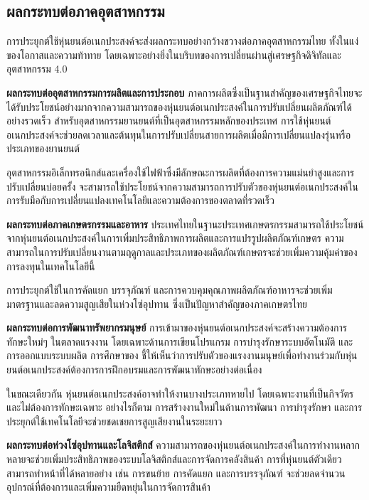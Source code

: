 \documentclass[a4paper]{article}
\begin{document}
\subsection{ผลกระทบต่อภาคอุตสาหกรรม}

การประยุกต์ใช้หุ่นยนต์อเนกประสงค์จะส่งผลกระทบอย่างกว้างขวางต่อภาคอุตสาหกรรมไทย ทั้งในแง่ของโอกาสและความท้าทาย โดยเฉพาะอย่างยิ่งในบริบทของการเปลี่ยนผ่านสู่เศรษฐกิจดิจิทัลและอุตสาหกรรม 4.0

\textbf{ผลกระทบต่ออุตสาหกรรมการผลิตและการประกอบ} ภาคการผลิตซึ่งเป็นฐานสำคัญของเศรษฐกิจไทยจะได้รับประโยชน์อย่างมากจากความสามารถของหุ่นยนต์อเนกประสงค์ในการปรับเปลี่ยนผลิตภัณฑ์ได้อย่างรวดเร็ว \parencite{mohammadi2023mobile} สำหรับอุตสาหกรรมยานยนต์ที่เป็นอุตสาหกรรมหลักของประเทศ การใช้หุ่นยนต์อเนกประสงค์จะช่วยลดเวลาและต้นทุนในการปรับเปลี่ยนสายการผลิตเมื่อมีการเปลี่ยนแปลงรุ่นหรือประเภทของยานยนต์

อุตสาหกรรมอิเล็กทรอนิกส์และเครื่องใช้ไฟฟ้าซึ่งมีลักษณะการผลิตที่ต้องการความแม่นยำสูงและการปรับเปลี่ยนบ่อยครั้ง จะสามารถใช้ประโยชน์จากความสามารถการปรับตัวของหุ่นยนต์อเนกประสงค์ในการรับมือกับการเปลี่ยนแปลงเทคโนโลยีและความต้องการของตลาดที่รวดเร็ว

\textbf{ผลกระทบต่อภาคเกษตรกรรมและอาหาร} ประเทศไทยในฐานะประเทศเกษตรกรรมสามารถใช้ประโยชน์จากหุ่นยนต์อเนกประสงค์ในการเพิ่มประสิทธิภาพการผลิตและการแปรรูปผลิตภัณฑ์เกษตร ความสามารถในการปรับเปลี่ยนงานตามฤดูกาลและประเภทของผลิตภัณฑ์เกษตรจะช่วยเพิ่มความคุ้มค่าของการลงทุนในเทคโนโลยีนี้

การประยุกต์ใช้ในการคัดแยก บรรจุภัณฑ์ และการควบคุมคุณภาพผลิตภัณฑ์อาหารจะช่วยเพิ่มมาตรฐานและลดความสูญเสียในห่วงโซ่อุปทาน ซึ่งเป็นปัญหาสำคัญของภาคเกษตรไทย

\textbf{ผลกระทบต่อการพัฒนาทรัพยากรมนุษย์} การเข้ามาของหุ่นยนต์อเนกประสงค์จะสร้างความต้องการทักษะใหม่ๆ ในตลาดแรงงาน โดยเฉพาะด้านการเขียนโปรแกรม การบำรุงรักษาระบบอัตโนมัติ และการออกแบบระบบผลิต การศึกษาของ \textcite{krishnan2023deep} ชี้ให้เห็นว่าการปรับตัวของแรงงานมนุษย์เพื่อทำงานร่วมกับหุ่นยนต์อเนกประสงค์ต้องการการฝึกอบรมและการพัฒนาทักษะอย่างต่อเนื่อง

ในขณะเดียวกัน หุ่นยนต์อเนกประสงค์อาจทำให้งานบางประเภทหายไป โดยเฉพาะงานที่เป็นกิจวัตรและไม่ต้องการทักษะเฉพาะ อย่างไรก็ตาม การสร้างงานใหม่ในด้านการพัฒนา การบำรุงรักษา และการประยุกต์ใช้เทคโนโลยีจะช่วยชดเชยการสูญเสียงานในระยะยาว

\textbf{ผลกระทบต่อห่วงโซ่อุปทานและโลจิสติกส์} ความสามารถของหุ่นยนต์อเนกประสงค์ในการทำงานหลากหลายจะช่วยเพิ่มประสิทธิภาพของระบบโลจิสติกส์และการจัดการคลังสินค้า \parencite{vitolo2022mobile} การที่หุ่นยนต์ตัวเดียวสามารถทำหน้าที่ได้หลายอย่าง เช่น การขนย้าย การคัดแยก และการบรรจุภัณฑ์ จะช่วยลดจำนวนอุปกรณ์ที่ต้องการและเพิ่มความยืดหยุ่นในการจัดการสินค้า
\end{document}
